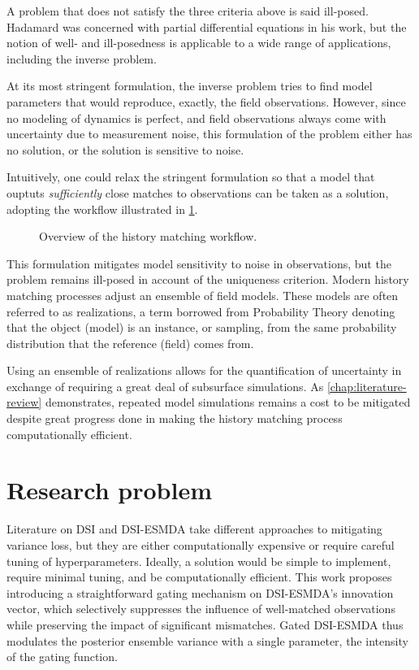     A problem that does not satisfy the three criteria above is said ill-posed.
    Hadamard was concerned with partial differential equations in his work, 
    but the notion of well- and ill-posedness is applicable to a wide range of applications,
    including the inverse problem.

    At its most stringent formulation, the inverse problem tries to find model parameters 
    that would reproduce, exactly, the field observations.
    However, since no modeling of dynamics is perfect, and field observations always come with uncertainty due to measurement noise,
    this formulation of the problem either has no solution, or the solution is sensitive to noise.

    Intuitively, one could relax the stringent formulation so that a model that ouptuts 
    \emph{sufficiently} close matches to observations can be taken as a solution,
    adopting the workflow illustrated in \cref{fig:flowchart-history-matching}.
    \begin{figure}[htbp]
        \centering 
        \caption{Overview of the history matching workflow.}
        \label{fig:flowchart-history-matching}
        \scalebox{0.875}{%
            
        }
    \end{figure}
    This formulation mitigates model sensitivity to noise in observations, but the problem remains ill-posed in account of the uniqueness criterion.
    Modern history matching processes adjust an ensemble of field models.
    These models are often referred to as realizations, a term borrowed from Probability Theory 
    denoting that the object (model) is an instance, or sampling, 
    from the same probability distribution that the reference (field) comes from.

    Using an ensemble of realizations allows for the quantification of uncertainty 
    in exchange of requiring a great deal of subsurface simulations.
    As \cref{chap:literature-review} demonstrates,
    repeated model simulations remains a cost to be mitigated
    despite great progress done in making the history matching process computationally efficient.

\section{Research problem}

    Literature on DSI and DSI-ESMDA take different approaches to mitigating variance loss, but they are either computationally expensive or require careful tuning of hyperparameters.
    Ideally, a solution would be simple to implement, require minimal tuning, and be computationally efficient.
    This work proposes introducing a straightforward gating mechanism on DSI-ESMDA's innovation vector, which selectively suppresses the influence of well-matched observations while preserving the impact of significant mismatches.
    Gated DSI-ESMDA thus modulates the posterior ensemble variance with a single parameter, the intensity of the gating function.

